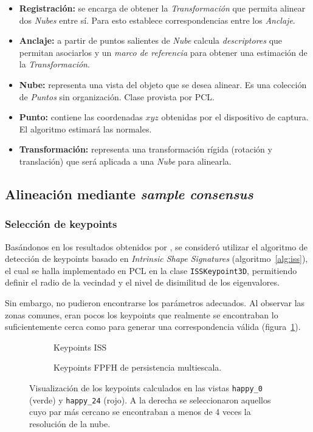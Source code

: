 		\begin{itemize}
			\item {\bfseries Registración:} se encarga de obtener la \emph{Transformación} que
				permita alinear dos \emph{Nubes} entre sí.  Para esto establece
				correspondencias entre los \emph{Anclaje}.
			\item {\bfseries Anclaje:} a partir de puntos salientes de \emph{Nube} calcula
				\emph{descriptores}  que permitan asociarlos y un
				\emph{marco de referencia} para obtener una estimación de la
				\emph{Transformación}.
			\item {\bfseries Nube:} representa una vista del objeto que se desea alinear.
				Es una colección de \emph{Puntos} sin organización. Clase
				provista por PCL.
			\item {\bfseries Punto:} contiene las coordenadas $xyz$ obtenidas por el
				dispositivo de captura. El algoritmo estimará las normales.
			\item {\bfseries Transformación:} representa una transformación rígida
				(rotación y translación) que será aplicada a una \emph{Nube}
				para alinearla.
		\end{itemize}


	\subsection{Alineación mediante \emph{sample consensus}}
		\subsubsection{Selección de keypoints}
			Basándonos en los resultados obtenidos por \cite{ISS},
			se consideró utilizar el algoritmo de detección de keypoints basado en \emph{Intrinsic Shape Signatures} (algoritmo~\ref{alg:iss}),
			el cual se halla implementado en PCL en la clase \texttt{ISSKeypoint3D}, permitiendo
			definir el radio de la vecindad y el nivel de disimilitud de los eigenvalores.


			Sin embargo, no pudieron encontrarse los parámetros adecuados.
			Al observar las zonas comunes, eran pocos los keypoints que
			realmente se encontraban lo suficientemente cerca como para generar
			una correspondencia válida (figura~\ref{fig:iss_key}).


			\begin{figure}
				\centering
				\begin{subfigure}{\linewidth}
					\caption{\label{fig:iss_key}Keypoints ISS}
				\end{subfigure}

				\begin{subfigure}{\linewidth}
					\caption{\label{fig:multiscale_key}Keypoints FPFH de persistencia multiescala.}
				\end{subfigure}
				\caption{\label{fig:keypoints}Visualización de los keypoints calculados en las vistas
					\texttt{happy\_0} (verde) y \texttt{happy\_24} (rojo).
					A la derecha se seleccionaron aquellos cuyo par
					más cercano se encontraban a menos de 4 veces la resolución
					de la nube.}
			\end{figure}

